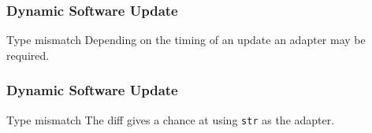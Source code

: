 \documentclass{beamer}
\begin{document}
\begin{frame}[fragile]
  \frametitle{Dynamic Software Update}
  \begin{block}{Type mismatch}
    Depending on the timing of an update an adapter may be required.
  \end{block}

  \begin{example}
    \begin{center}
      \begin{minipage}{.54\textwidth}
       
      \end{minipage}
      \hfill
      \begin{minipage}{.45\textwidth}
        
      \end{minipage}
    \end{center}
  \end{example}
\end{frame}

\begin{frame}[fragile]
  \frametitle{Dynamic Software Update}
  \begin{block}{Type mismatch}
    The diff gives a chance at using \verb|str| as the adapter.
  \end{block}

  \begin{example}
    
  \end{example}
\end{frame}
\end{document}
